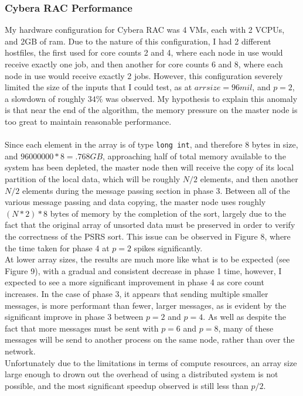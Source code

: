 \documentclass[11pt]{report}
\begin{document}
\subsubsection*{Cybera RAC Performance}
My hardware configuration for Cybera RAC was 4 VMs, each with 2 VCPUs, and 2GB of ram. Due to the nature of this configuration, I had 2 different hostfiles, the first used 
for core counts 2 and 4, where each node in use would receive exactly one job, and then another for core counts 6 and 8, where each node in use would receive exactly 2 jobs.
However, this configuration severely limited the size of the inputs that I could test, as at $arr size=96mil$, and $p=2$, a slowdown of roughly $34\%$ was observed. My
hypothesis to explain this anomaly is that near the end of the algorithm, the memory pressure on the master node is too great to maintain reasonable performance.\\\\
Since each element in the array is of type \verb|long int|, and therefore 8 bytes in size, and $96000000* 8 = .768 GB$, approaching half of total memory available to the 
system has been depleted, the master node then will receive the copy of its local partition of the local data, which will be roughly $N/2$ elements, and then another $N/2$
elements during the message passing section in phase 3. Between all of the various message passing and data copying, the master node uses roughly $(N*2) * 8$ bytes of 
memory by the completion of the sort, largely due to the fact that the original array of unsorted data must be preserved in order to verify the correctness of the
PSRS sort. This issue can be observed in Figure 8, where the time taken for phase 4 at $p=2$ spikes significantly.\\
At lower array sizes, the results are much more like what is to be expected (see Figure 9), with a gradual and consistent decrease in phase 1 time, however, I expected to see a more significant improvement in phase 4 as core count increases. In the case of phase 3, it appears that sending multiple smaller
messages, is more performant than fewer, larger messages, as is evident by the significant improve in phase 3 between $p=2$ and $p=4$. As well as despite the fact that more
messages must be sent with $p=6$ and $p=8$, many of these messages will be send to another process on the same node, rather than over the network.\\
Unfortunately due to the limitations in terms of compute resources, an array size large enough to drown out the overhead of using a distributed system is not possible, and the most significant speedup observed is still less than $p/2$.
\end{document}
